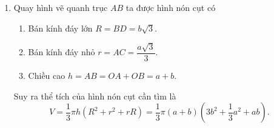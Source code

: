 \begin{bt}
{\begin{enumerate}
{
			}
			Khi đó thể tích của hình nón này là 
			$$V_2=\dfrac{1}{3} \pi r^2 h= \pi b^3.$$
			Vậy thể tích cần tìm là $\dfrac{V_1}{V_2}= \dfrac{a^3}{9b^3}$.
			\item
			Quay hình vẽ quanh trục $AB$ ta được hình nón cụt có
			\begin{enumerate}[+]
				\item Bán kính đáy lớn $R=BD=b \sqrt{3}$.
				\item Bán kính đáy nhỏ $r=AC=\dfrac{a \sqrt{3}}{3}$.
				\item Chiều cao $h=AB=OA+OB=a+b$.
			\end{enumerate}
			Suy ra thể tích của hình nón cụt cần tìm là 
			$$V= \dfrac{1}{3}\pi h \left( R^2+r^2+rR \right)=\dfrac{1}{3}\pi (a+b) \left( 3b^2+\dfrac{1}{3}a^2+ab \right).$$
		\end{enumerate}
	}
\end{bt} 

